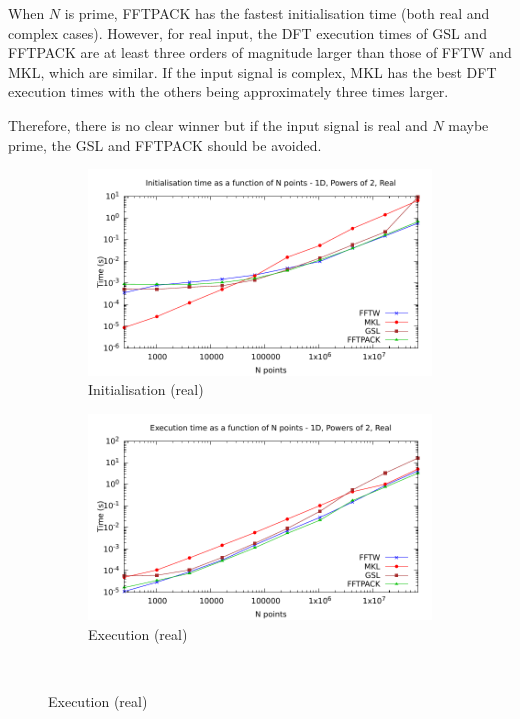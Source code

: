\documentclass[12pt, a4paper]{article} \setlength{\textheight}{24cm}
\begin{document}
When $N$ is prime, FFTPACK has the fastest initialisation time (both
real and complex cases). However, for real input, the DFT execution
times of GSL and FFTPACK are at least three orders of magnitude larger
than those of FFTW and MKL, which are similar. If the input signal is
complex, MKL has the best DFT execution times with the others being
approximately three times larger.


Therefore, there is no clear winner but if the input signal is real
and $N$ maybe prime, the GSL and FFTPACK should be avoided.


\begin{figure}[H]
  \centering
  \begin{subfigure}{.5\textwidth}
    \centering
    \includegraphics[width=.9\linewidth]{graphs/1d-pow2-init-r.pdf}
    \caption{Initialisation (real)}
    \label{1DPOW2RI}
  \end{subfigure}%
  \begin{subfigure}{.5\textwidth}
    \centering
    \includegraphics[width=.9\linewidth]{graphs/1d-pow2-exec-r.pdf}
    \caption{Execution (real)}
    \label{1DPOW2R}
  \end{subfigure}\\

\end{figure}
\end{document}
